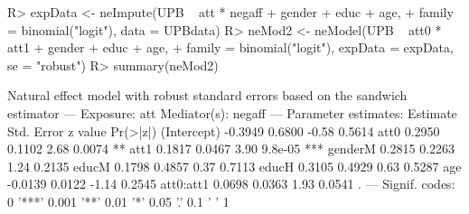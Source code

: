 \documentclass[nojss]{jss}
\begin{document}
\begin{Schunk}
\begin{Sinput}
R> expData <- neImpute(UPB ~ att * negaff + gender + educ + age,
+    family = binomial("logit"), data = UPBdata)
R> neMod2 <- neModel(UPB ~ att0 * att1 + gender + educ + age,
+    family = binomial("logit"), expData = expData, se = "robust")
R> summary(neMod2)
\end{Sinput}
\begin{Soutput}
Natural effect model
with robust standard errors based on the sandwich estimator
---
Exposure: att 
Mediator(s): negaff 
---
Parameter estimates:
            Estimate Std. Error z value Pr(>|z|)    
(Intercept)  -0.3949     0.6800   -0.58   0.5614    
att0          0.2950     0.1102    2.68   0.0074 ** 
att1          0.1817     0.0467    3.90  9.8e-05 ***
genderM       0.2815     0.2263    1.24   0.2135    
educM         0.1798     0.4857    0.37   0.7113    
educH         0.3105     0.4929    0.63   0.5287    
age          -0.0139     0.0122   -1.14   0.2545    
att0:att1     0.0698     0.0363    1.93   0.0541 .  
---
Signif. codes:  0 '***' 0.001 '**' 0.01 '*' 0.05 '.' 0.1 ' ' 1
\end{Soutput}
\end{Schunk}
\end{document}
